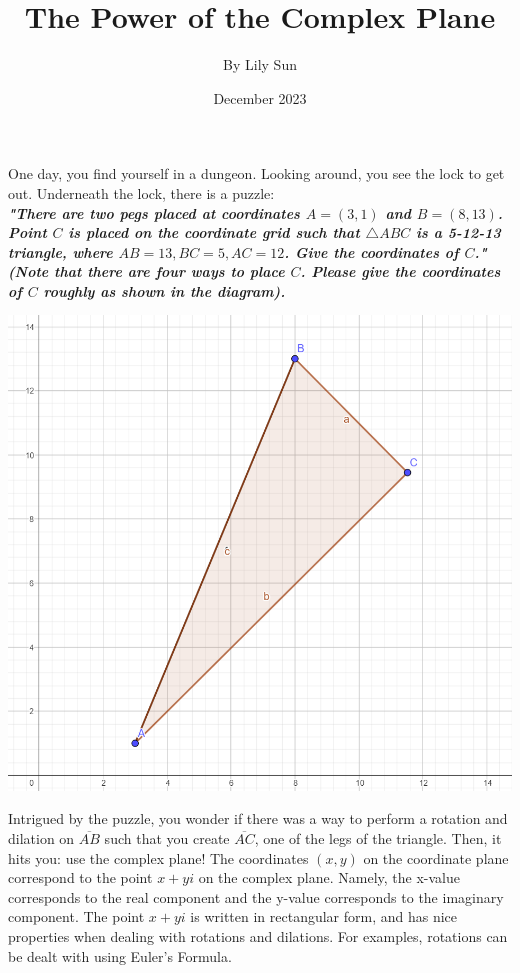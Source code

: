 \documentclass{article}
\title{The Power of the Complex Plane}
\author{By Lily Sun}
\date{December 2023}
\begin{document}
\maketitle
One day, you find yourself in a dungeon. Looking around, you see the lock to get out. Underneath the lock, there is a puzzle: \\

\textit{\textbf{"There are two pegs placed at coordinates $A = (3, 1)$ and $B = (8, 13)$. Point $C$ is placed on the coordinate grid such that $\triangle ABC$ is a 5-12-13 triangle, where $AB = 13, BC = 5, AC = 12$. Give the coordinates of $C$." (Note that there are four ways to place $C$. Please give the coordinates of $C$ roughly as shown in the diagram).}} \\

\begin{center}
\includegraphics[scale = 0.5]{dec23/images/A3_1.png} \\
\end{center}

Intrigued by the puzzle, you wonder if there was a way to perform a rotation and dilation on $\overline{AB}$ such that you create $\overline{AC}$, one of the legs of the triangle. Then, it hits you: use the complex plane! The coordinates $(x, y)$ on the coordinate plane correspond to the point $x + yi$ on the complex plane. Namely, the x-value corresponds to the real component and the y-value corresponds to the imaginary component. The point $x+yi$ is written in rectangular form, and has nice properties when dealing with rotations and dilations. For examples, rotations can be dealt with using Euler's Formula.
\end{document}
